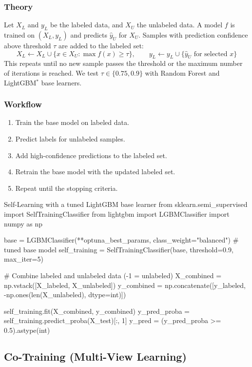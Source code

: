 \subsubsection{Theory}
Let $X_L$ and $y_L$ be the labeled data, and $X_U$ the unlabeled data. A model $f$ is trained
on $(X_L, y_L)$ and predicts $\hat{y}_U$ for $X_U$. Samples with prediction confidence above
threshold $\tau$ are added to the labeled set:
\[
X_L \leftarrow X_L \cup \{x \in X_U : \max f(x) \ge \tau\}, \qquad
y_L \leftarrow y_L \cup \{\hat{y}_U \text{ for selected } x\}
\]
This repeats until no new sample passes the threshold or the maximum number of iterations is
reached. We test $\tau \in \{0.75, 0.9\}$ with Random Forest and LightGBM$^*$ base learners.

\subsubsection{Workflow}
\begin{enumerate}
  \item Train the base model on labeled data.
  \item Predict labels for unlabeled samples.
  \item Add high-confidence predictions to the labeled set.
  \item Retrain the base model with the updated labeled set.
  \item Repeat until the stopping criteria.
\end{enumerate}

\begin{pycode}{Self-Learning with a tuned LightGBM base learner}
from sklearn.semi_supervised import SelfTrainingClassifier
from lightgbm import LGBMClassifier
import numpy as np

base = LGBMClassifier(**optuna_best_params, class_weight="balanced")   # tuned base model
self_training = SelfTrainingClassifier(base, threshold=0.9, max_iter=5)

# Combine labeled and unlabeled data (-1 = unlabeled)
X_combined = np.vstack([X_labeled, X_unlabeled])
y_combined = np.concatenate([y_labeled, -np.ones(len(X_unlabeled), dtype=int)])

self_training.fit(X_combined, y_combined)
y_pred_proba = self_training.predict_proba(X_test)[:, 1]
y_pred = (y_pred_proba >= 0.5).astype(int)
\end{pycode}

\subsection{Co-Training (Multi-View Learning)}

